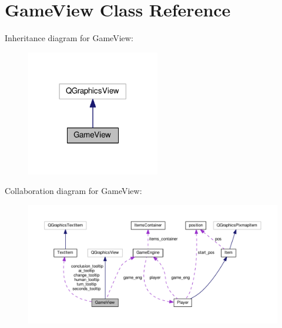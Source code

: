 \hypertarget{class_game_view}{}\section{Game\+View Class Reference}
\label{class_game_view}


Inheritance diagram for Game\+View\+:\nopagebreak
\begin{figure}[H]
\begin{center}
\leavevmode
\includegraphics[width=165pt]{class_game_view__inherit__graph}
\end{center}
\end{figure}


Collaboration diagram for Game\+View\+:\nopagebreak
\begin{figure}[H]
\begin{center}
\leavevmode
\includegraphics[width=350pt]{class_game_view__coll__graph}
\end{center}
\end{figure}

